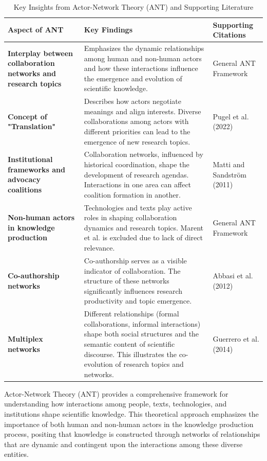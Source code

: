 \documentclass[12pt]{article}
\begin{document}
\begin{table}[ht]
\centering
\caption{Key Insights from Actor-Network Theory (ANT) and Supporting Literature}
\label{tab:ant_insights}
\begin{tabularx}{\textwidth}{|X|X|X|}
\hline
\textbf{Aspect of ANT} & \textbf{Key Findings} & \textbf{Supporting Citations} \\ \hline

\textbf{Interplay between collaboration networks and research topics} & Emphasizes the dynamic relationships among human and non-human actors and how these interactions influence the emergence and evolution of scientific knowledge. & General ANT Framework \\ \hline

\textbf{Concept of "Translation"} & Describes how actors negotiate meanings and align interests. Diverse collaborations among actors with different priorities can lead to the emergence of new research topics. & Pugel et al. (2022) \\ \hline

\textbf{Institutional frameworks and advocacy coalitions} & Collaboration networks, influenced by historical coordination, shape the development of research agendas. Interactions in one area can affect coalition formation in another. & Matti and Sandström (2011) \\ \hline

\textbf{Non-human actors in knowledge production} & Technologies and texts play active roles in shaping collaboration dynamics and research topics. Marent et al. is excluded due to lack of direct relevance. & General ANT Framework \\ \hline

\textbf{Co-authorship networks} & Co-authorship serves as a visible indicator of collaboration. The structure of these networks significantly influences research productivity and topic emergence. & Abbasi et al. (2012) \\ \hline

\textbf{Multiplex networks} & Different relationships (formal collaborations, informal interactions) shape both social structures and the semantic content of scientific discourse. This illustrates the co-evolution of research topics and networks. & Guerrero et al. (2014) \\ \hline
\end{tabularx}
\end{table}
Actor-Network Theory (ANT) provides a comprehensive framework for understanding how interactions among people, texts, technologies, and institutions shape scientific knowledge. This theoretical approach emphasizes the importance of both human and non-human actors in the knowledge production process, positing that knowledge is constructed through networks of relationships that are dynamic and contingent upon the interactions among these diverse entities.
\end{document}
